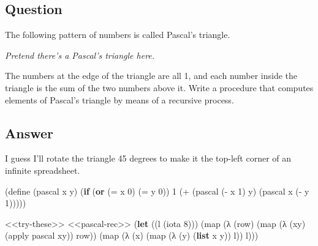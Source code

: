 \documentclass[
]{article}
\newenvironment{Shaded}{}{}
\newcommand{\DecValTok}[1]{\textcolor[rgb]{0.25,0.63,0.44}{#1}}
\newcommand{\ExtensionTok}[1]{#1}
\newcommand{\FunctionTok}[1]{\textcolor[rgb]{0.02,0.16,0.49}{#1}}
\newcommand{\KeywordTok}[1]{\textcolor[rgb]{0.00,0.44,0.13}{\textbf{#1}}}
\newcommand{\NormalTok}[1]{#1}
\newcommand{\OperatorTok}[1]{\textcolor[rgb]{0.40,0.40,0.40}{#1}}
\begin{document}
\hypertarget{question-11}{%
\subsection{Question}\label{question-11}}

The following pattern of numbers is called Pascal's triangle.

\emph{Pretend there's a Pascal's triangle here.}

The numbers at the edge of the triangle are all 1, and each number
inside the triangle is the sum of the two numbers above it. Write a
procedure that computes elements of Pascal's triangle by means of a
recursive process.

\hypertarget{answer-11}{%
\subsection{Answer}\label{answer-11}}

I guess I'll rotate the triangle 45 degrees to make it the top-left
corner of an infinite spreadsheet.

\hypertarget{pascal-rec}{%
\label{pascal-rec}}%
\begin{Shaded}
\begin{Highlighting}[numbers=left,,]
\NormalTok{(}\ExtensionTok{define}\FunctionTok{ }\NormalTok{(pascal x y)}
\NormalTok{  (}\KeywordTok{if}\NormalTok{ (}\KeywordTok{or}\NormalTok{ (}\OperatorTok{=}\NormalTok{ x }\DecValTok{0}\NormalTok{)}
\NormalTok{          (}\OperatorTok{=}\NormalTok{ y }\DecValTok{0}\NormalTok{))}
      \DecValTok{1}
\NormalTok{      (}\OperatorTok{+}\NormalTok{ (pascal (}\OperatorTok{{-}}\NormalTok{ x }\DecValTok{1}\NormalTok{) y)}
\NormalTok{         (pascal x (}\OperatorTok{{-}}\NormalTok{ y }\DecValTok{1}\NormalTok{)))))}
\end{Highlighting}
\end{Shaded}

\begin{Shaded}
\begin{Highlighting}[numbers=left,,]
\NormalTok{\textless{}\textless{}try{-}these\textgreater{}\textgreater{}}
\NormalTok{\textless{}\textless{}pascal{-}rec\textgreater{}\textgreater{}}
\NormalTok{(}\KeywordTok{let}\NormalTok{ ((l (iota }\DecValTok{8}\NormalTok{)))}
\NormalTok{  (map (λ (row)}
\NormalTok{         (map (λ (xy)}
\NormalTok{                (apply pascal xy))}
\NormalTok{              row))}
\NormalTok{       (map (λ (x)}
\NormalTok{              (map (λ (y)}
\NormalTok{                     (}\KeywordTok{list}\NormalTok{ x y))}
\NormalTok{                   l))}
\NormalTok{            l)))}
\end{Highlighting}
\end{Shaded}
\end{document}
